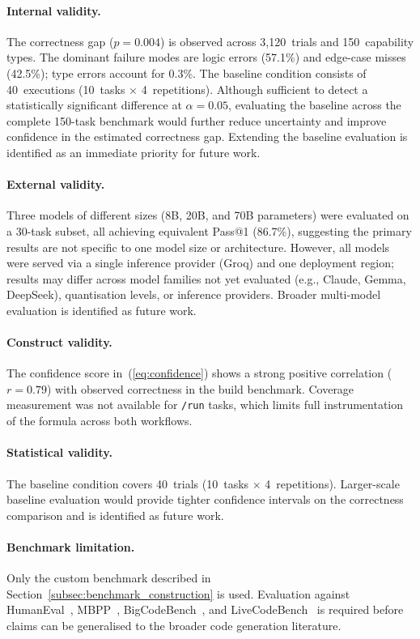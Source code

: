 \documentclass[conference]{IEEEtran}
\begin{document}
\paragraph{Internal validity.}
The correctness gap ($p = 0.004$) is observed across 3{,}120~trials and
150~capability types.
The dominant failure modes are logic errors (57.1\%) and edge-case misses
(42.5\%); type errors account for 0.3\%.
The baseline condition consists of 40~executions (10~tasks $\times$
4~repetitions).
Although sufficient to detect a statistically significant difference at
$\alpha = 0.05$, evaluating the baseline across the complete 150-task
benchmark would further reduce uncertainty and improve confidence in the
estimated correctness gap.
Extending the baseline evaluation is identified as an immediate priority
for future work.

\paragraph{External validity.}
Three models of different sizes (8B, 20B, and 70B parameters) were
evaluated on a 30-task subset, all achieving equivalent Pass@1 (86.7\%),
suggesting the primary results are not specific to one model size or
architecture.
However, all models were served via a single inference provider (Groq)
and one deployment region; results may differ across model families not
yet evaluated (e.g., Claude, Gemma, DeepSeek), quantisation levels, or
inference providers.
Broader multi-model evaluation is identified as future work.

\paragraph{Construct validity.}
The confidence score in~(\ref{eq:confidence}) shows a strong positive
correlation ($r = 0.79$) with observed correctness in the build benchmark.
Coverage measurement was not available for \texttt{/run} tasks, which
limits full instrumentation of the formula across both workflows.

\paragraph{Statistical validity.}
The baseline condition covers 40~trials (10~tasks $\times$ 4~repetitions).
Larger-scale baseline evaluation would provide tighter confidence
intervals on the correctness comparison and is identified as future work.

\paragraph{Benchmark limitation.}
Only the custom benchmark described in
Section~\ref{subsec:benchmark_construction} is used.
Evaluation against HumanEval~\cite{chen2021humaneval},
MBPP~\cite{austin2021mbpp}, BigCodeBench~\cite{zhuo2024bigcodebench},
and LiveCodeBench~\cite{jain2024livecodebench} is required before claims
can be generalised to the broader code generation literature.
\end{document}
